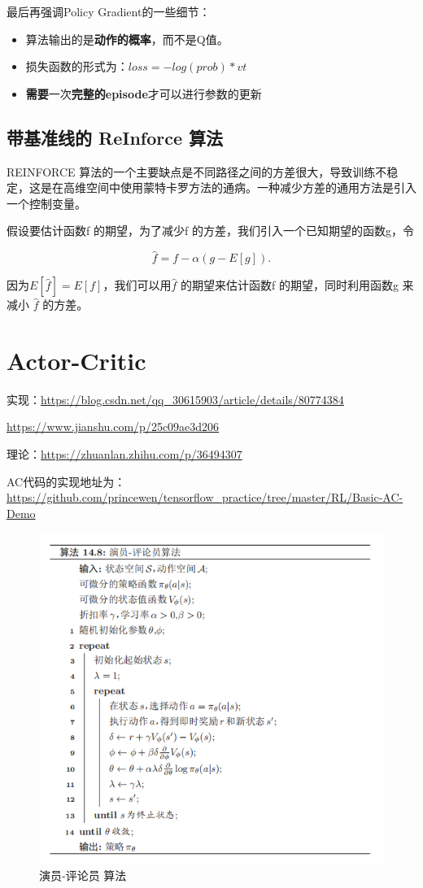 \documentclass[UTF8,a4paper,12pt]{ctexbook}
\begin{document}
			最后再强调Policy Gradient的一些细节：
			\begin{itemize}
				\item 算法输出的是\textbf{动作的概率}，而不是Q值。
				\item 损失函数的形式为：$loss= -log(prob)*vt$
				\item \textbf{需要}一次\textbf{完整的episode}才可以进行参数的更新
			\end{itemize}
		
		\subsection{带基准线的 ReInforce 算法}
			REINFORCE 算法的一个主要缺点是不同路径之间的方差很大，导致训练不稳定，这是在高维空间中使用蒙特卡罗方法的通病。一种减少方差的通用方法是引入一个控制变量。
			
			假设要估计函数f 的期望，为了减少f 的方差，我们引入一个已知期望的函数g，令
			
			$$\hat{f} = f - \alpha(g - E[g]).$$
			
			因为$E[\hat{f}] = E[f]$，我们可以用$\hat{f}$ 的期望来估计函数f 的期望，同时利用函数g 来减小 $\hat{f}$ 的方差。
			
	\section{Actor-Critic}
		实现：\url{https://blog.csdn.net/qq_30615903/article/details/80774384}
			
			\url{https://www.jianshu.com/p/25c09ae3d206}
			
		理论：\url{https://zhuanlan.zhihu.com/p/36494307}
		
		AC代码的实现地址为：\url{https://github.com/princewen/tensorflow_practice/tree/master/RL/Basic-AC-Demo}
		
			\begin{figure}[H]
				\centering
				\includegraphics[width=.95\linewidth]{Actor-Critic2}
				\caption{演员-评论员 算法}
			\end{figure}		
		
\end{document}
